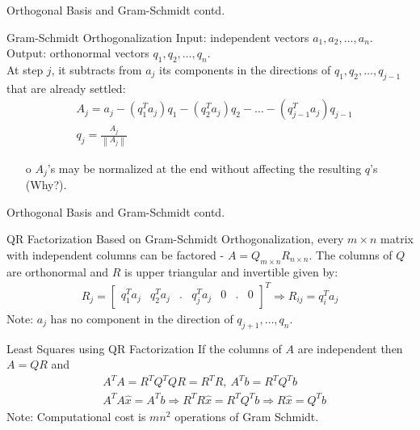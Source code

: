 \documentclass{beamer}
\begin{document}
\begin{frame}{Orthogonal Basis and Gram-Schmidt contd.}
\begin{exampleblock}{Gram-Schmidt Orthogonalization}
Input: independent vectors $a_1, a_2, \ldots, a_n$.\\
Output: orthonormal vectors $q_1, q_2, \ldots, q_n$.\\
At step $j$, it subtracts from $a_j$ its components in the directions of $q_1, q_2, \ldots, q_{j-1}$ that are already settled:
\begin{align*}
    &A_j = a_j - (q_1^Ta_j)q_1 - (q_2^Ta_j)q_2 - \ldots - (q_{j-1}^Ta_j)q_{j-1}\\
    &q_j = \frac{A_j}{\left\|A_j\right\|}
\end{align*}
\begin{itemize}
    \item[o] $A_j$'s may be normalized at the end without affecting the resulting $q$'s (Why?).
\end{itemize}
\end{exampleblock}
\end{frame}

\begin{frame}{Orthogonal Basis and Gram-Schmidt contd.}
\begin{exampleblock}{QR Factorization}
Based on Gram-Schmidt Orthogonalization, every $m\times n$ matrix with independent columns can be factored - $A = Q_{m\times n}R_{n \times n}$. The columns of $Q$ are orthonormal and $R$ is upper triangular and invertible given by:
\begin{align*}
    R_{j} = \begin{bmatrix}q_1^Ta_j&q_2^Ta_j&.&q_j^Ta_j&0&.&0\end{bmatrix}^T \Rightarrow R_{ij} = q_i^Ta_j
\end{align*}
Note: $a_j$ has no component in the direction of $q_{j+1},\ldots,q_{n}$.
\end{exampleblock}
\begin{exampleblock}{Least Squares using QR Factorization}
If the columns of $A$ are independent then $A=QR$ and
\begin{align*}
    &A^TA = R^TQ^TQR = R^TR, \ A^Tb = R^TQ^Tb\\
    &A^TA\hat{x} = A^Tb \Rightarrow R^TR\hat{x} = R^TQ^Tb \Rightarrow R\hat{x} = Q^Tb
\end{align*}
Note: Computational cost is $mn^2$ operations of Gram Schmidt.
\end{exampleblock}
\end{frame}
\end{document}
